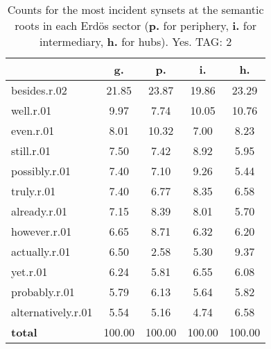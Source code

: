\begin{table}[h!]
\begin{center}
\begin{tabular}{| l || c | c | c | c |}\hline
 & {\bf g.} & {\bf p.} & {\bf i.} & {\bf h.} \\\hline\hline
besides.r.02 & 21.85  & 23.87  & 19.86  & 23.29 \\\hline
well.r.01 & 9.97  & 7.74  & 10.05  & 10.76 \\\hline
even.r.01 & 8.01  & 10.32  & 7.00  & 8.23 \\\hline
still.r.01 & 7.50  & 7.42  & 8.92  & 5.95 \\\hline
possibly.r.01 & 7.40  & 7.10  & 9.26  & 5.44 \\\hline
truly.r.01 & 7.40  & 6.77  & 8.35  & 6.58 \\\hline
already.r.01 & 7.15  & 8.39  & 8.01  & 5.70 \\\hline
however.r.01 & 6.65  & 8.71  & 6.32  & 6.20 \\\hline
actually.r.01 & 6.50  & 2.58  & 5.30  & 9.37 \\\hline
yet.r.01 & 6.24  & 5.81  & 6.55  & 6.08 \\\hline
probably.r.01 & 5.79  & 6.13  & 5.64  & 5.82 \\\hline
alternatively.r.01 & 5.54  & 5.16  & 4.74  & 6.58 \\\hline\hline
{{\bf total}} & 100.00  & 100.00  & 100.00  & 100.00 \\\hline
\end{tabular}
\caption{Counts for the most incident synsets at the semantic roots in each Erd\"os sector ({\bf p.} for periphery, {\bf i.} for intermediary, {\bf h.} for hubs). Yes. TAG: 2}
\end{center}
\end{table}